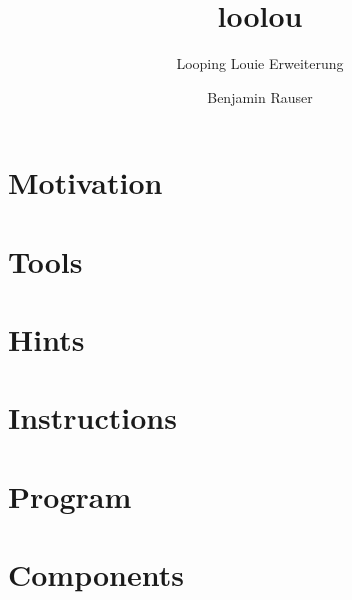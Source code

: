 \documentclass[a4paper]{scrartcl}
\begin{document}
	\author{Benjamin Rauser}
	\title{loolou}
	\subtitle{Looping Louie Erweiterung}

	
	\newpage

	\tableofcontents
	\newpage

	\section{Motivation}
	
	\newpage

	\section{Tools}
	

	\section{Hints}
	
	\newpage

	\section{Instructions}
	
	\newpage

	\section{Program}
	
	\newpage

	\section{Components}
	
	\newpage

	\listoffigures

	\listoftables

	\lstlistoflistings
\end{document}
